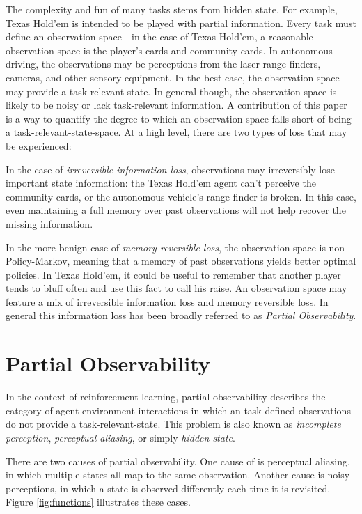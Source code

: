 \documentclass{article} %
\theoremstyle{definition}
\begin{document}
The complexity and fun of many tasks stems from hidden state. For
example, Texas Hold'em is intended to be played with partial
information. Every task must define an observation space - in the case
of Texas Hold'em, a reasonable observation space is the player's cards
and community cards. In autonomous driving, the observations may be
perceptions from the laser range-finders, cameras, and other sensory
equipment. In the best case, the observation space may provide a
task-relevant-state. In general though, the observation space is
likely to be noisy or lack task-relevant information. A contribution
of this paper is a way to quantify the degree to which an observation
space falls short of being a task-relevant-state-space. At a high
level, there are two types of loss that may be experienced:

In the case of \textit{irreversible-information-loss}, observations
may irreversibly lose important state information: the Texas Hold'em
agent can't perceive the community cards, or the autonomous vehicle's
range-finder is broken. In this case, even maintaining a full memory
over past observations will not help recover the missing information.

In the more benign case of \textit{memory-reversible-loss}, the
observation space is non-Policy-Markov, meaning that a memory of past
observations yields better optimal policies. In Texas Hold'em, it
could be useful to remember that another player tends to bluff often
and use this fact to call his raise. An observation space may feature
a mix of irreversible information loss and memory reversible loss. In
general this information loss has been broadly referred to as
\textit{Partial Observability}.

\section{Partial Observability}
In the context of reinforcement learning, partial observability
describes the category of agent-environment interactions in which an
task-defined observations do not provide a task-relevant-state. This
problem is also known as \textit{incomplete perception},
\textit{perceptual aliasing}, or simply \textit{hidden state}.

There are two causes of partial observability. One cause of is
perceptual aliasing, in which multiple states all map to the same
observation. Another cause is noisy perceptions, in which a state is
observed differently each time it is revisited. Figure
\ref{fig:functions} illustrates these cases.
\end{document}
